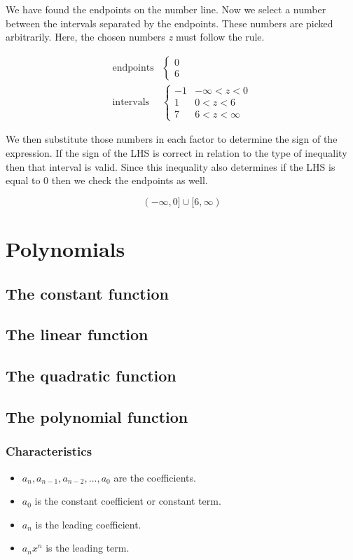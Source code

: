 \documentclass{amsbook}
\begin{document}
	We have found the endpoints on the number line.
	Now we select a number between the intervals separated by the endpoints.
	These numbers are picked arbitrarily.
	Here, the chosen numbers \textit{z} must follow the rule.

	\begin{align*}
		\text{endpoints}&
		\begin{cases}
			0 \\ 6
		\end{cases}	\\
		\text{intervals}&
		\begin{cases}
			-1& \text{$-\infty < z < 0$}	\\
			1&	\text{$0 < z < 6$}			\\
			7&	\text{$6 < z < \infty$}
		\end{cases}
	\end{align*}

	We then substitute those numbers in each factor to determine the sign
	of the expression.
	If the sign of the LHS is correct in relation to the type of inequality
	then that interval is valid.
	Since this inequality also determines if the LHS is equal to 0 then
	we check the endpoints as well.

	\begin{equation*}
		(-\infty, 0] \cup [6, \infty)
	\end{equation*}

\chapter{Polynomials}
\section{The constant function}
\section{The linear function}
\section{The quadratic function}

\section{The polynomial function}
\subsection{Characteristics}
	\begin{itemize}
		\item $a_n, a_{n-1}, a_{n-2}, \ldots, a_0$ are the coefficients.
		\item $a_0$ is the constant coefficient or constant term.
		\item $a_n$ is the leading coefficient.
		\item $a_nx^n$ is the leading term.
	\end{itemize}
\end{document}
